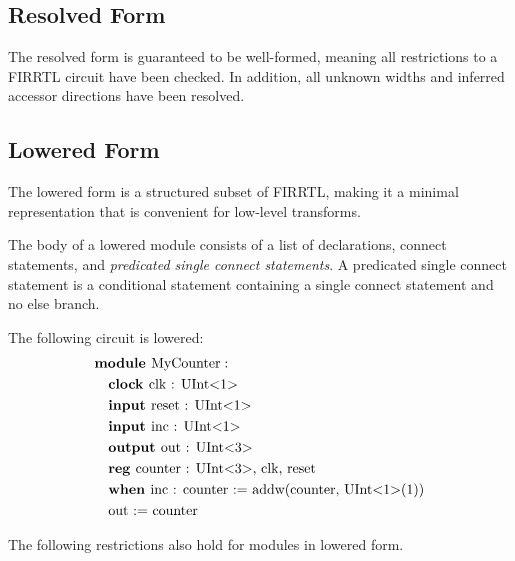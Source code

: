 \documentclass[12pt]{article}
\begin{document}
\subsection{Resolved Form}

The resolved form is guaranteed to be well-formed, meaning all restrictions to a FIRRTL circuit have been checked. In addition, all unknown widths and inferred accessor directions have been resolved.

\subsection{Lowered Form}

The lowered form is a structured subset of FIRRTL, making it a minimal representation that is convenient for low-level transforms. 

The body of a lowered module consists of a list of declarations, connect statements, and {\em predicated single connect statements}.
A predicated single connect statement is a conditional statement containing a single connect statement and no else branch.

The following circuit is lowered:
\[
\begin{aligned}
&\text{\bf module\ } \text{MyCounter} :                              \\
&\quad \text{\bf clock\ } \text{clk : UInt$<$1$>$}                        \\
&\quad \text{\bf input\ } \text{reset : UInt$<$1$>$}                        \\
&\quad \text{\bf input\ } \text{inc : UInt$<$1$>$}                           \\
&\quad \text{\bf output\ } \text{out : UInt$<$3$>$}                         \\
&\quad \text{\bf reg\ } \text{counter : UInt$<$3$>$, clk, reset} \\
&\quad \text{\bf when\ } \text{inc : counter := addw(counter, UInt$<$1$>$(1))}   \\
&\quad \text{out := counter}  \\
\end{aligned}
\]

The following restrictions also hold for modules in lowered form.
\end{document}
